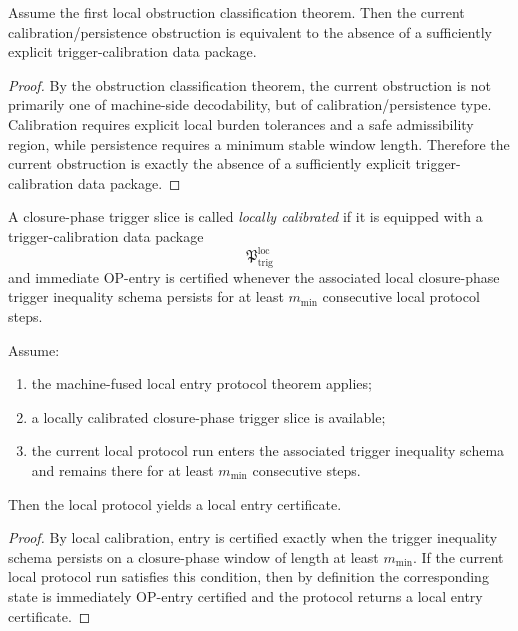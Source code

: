 \begin{proposition}
\label{prop:what-the-current-obstruction-is-really-asking-for}
Assume the first local obstruction classification theorem.
Then the current calibration/persistence obstruction is equivalent to the absence of a sufficiently explicit trigger-calibration data package.
\end{proposition}

\begin{proof}
By the obstruction classification theorem, the current obstruction is not primarily one of machine-side decodability, but of calibration/persistence type.
Calibration requires explicit local burden tolerances and a safe admissibility region, while persistence requires a minimum stable window length.
Therefore the current obstruction is exactly the absence of a sufficiently explicit trigger-calibration data package.
\end{proof}

\begin{definition}
\label{def:locally-calibrated-closure-phase-trigger-slice}
A closure-phase trigger slice is called \emph{locally calibrated} if it is equipped with a trigger-calibration data package
\[
\mathfrak{P}_{\mathrm{trig}}^{\mathrm{loc}}
\]
and immediate OP-entry is certified whenever the associated local closure-phase trigger inequality schema persists for at least \(m_{\min}\) consecutive local protocol steps.
\end{definition}

\begin{lemma}
\label{lem:first-local-calibration-to-entry-lemma}
Assume:
\begin{enumerate}
 \item the machine-fused local entry protocol theorem applies;
 \item a locally calibrated closure-phase trigger slice is available;
 \item the current local protocol run enters the associated trigger inequality schema and remains there for at least \(m_{\min}\) consecutive steps.
\end{enumerate}
Then the local protocol yields a local entry certificate.
\end{lemma}

\begin{proof}
By local calibration, entry is certified exactly when the trigger inequality schema persists on a closure-phase window of length at least \(m_{\min}\).
If the current local protocol run satisfies this condition, then by definition the corresponding state is immediately OP-entry certified and the protocol returns a local entry certificate.
\end{proof}

